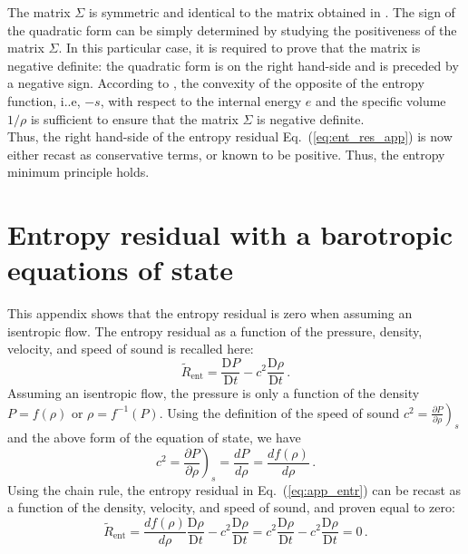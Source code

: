 \documentclass[preprint,10pt]{elsarticle}
\newcommand{\resinew}{\widetilde{R}_\text{ent}}
\newcommand{\matder}[1]{\frac{\textrm{D} #1}{\textrm{D} t}}
\newcommand{\eqt}[1]{Eq.~(\ref{#1})}                     %
\begin{document}
%
The matrix $\Sigma$ is symmetric and identical to the matrix obtained in \cite{jlg}. The sign of the quadratic form 
can be simply determined by studying the positiveness of the matrix $\Sigma$. In this particular case, it is required 
to prove that the matrix is negative definite: the quadratic form is on the right hand-side and is preceded by a negative 
sign. According to \cite{jlg}, the convexity of the opposite of the entropy function, i..e, $-s$, with respect to the internal energy $e$ 
and the specific volume $1/ \rho$ is sufficient to ensure that the matrix $\Sigma$ is negative definite. \\
Thus, the right hand-side of the entropy residual \eqt{eq:ent_res_app} is now either recast as conservative terms, 
or known to be positive. Thus, the entropy minimum principle holds.

\newpage
\section{Entropy residual with a barotropic equations of state} \label{app:ise_equ}

This appendix shows that the entropy residual is zero when assuming an isentropic flow. The entropy residual as a 
function of the pressure, density, velocity, and speed of sound is recalled here:
%
\begin{equation}\label{eq:app_entr}
\resinew = \matder P - c^2  \matder \rho \,.
\end{equation}
%
Assuming an isentropic flow, the pressure is only a function of the density $P = f( \rho )$ or $\rho = f^{-1}( P )$. 
Using the definition of the speed of sound $c^2 = \left. \frac{\partial P}{\partial \rho} \right)_s$ and the above 
form of the equation of state, we have
%
\begin{equation}\label{eq:app_sp}
c^2 = \left. \frac{\partial P}{\partial \rho} \right)_s = \frac{d P}{d \rho} = \frac{d f(\rho)}{d \rho} \,.
\end{equation}
%
Using the chain rule, the entropy residual in \eqt{eq:app_entr} can be recast as a function of the density, velocity, 
and speed of sound, and proven equal to zero:
%
\begin{equation}
\resinew = \frac{d f(\rho)}{d \rho}  \matder \rho - c^2  \matder  \rho  
         = c^2                       \matder \rho - c^2  \matder  \rho  
         =  0 \,.
\end{equation}

\end{document}
